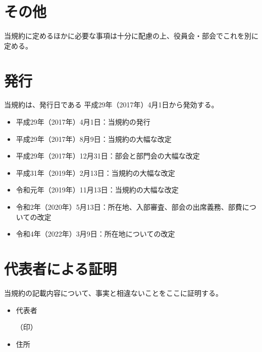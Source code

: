 \documentclass[12pt, unicode, a4paper]{ltjsreport}
\begin{document}
    \section*{その他}
        当規約に定めるほかに必要な事項は十分に配慮の上、役員会・部会でこれを別に定める。

    \section*{発行}
        当規約は、発行日である 平成29年（2017年）4月1日から発効する。
        \begin{itemize}
            \item 平成29年（2017年）4月1日：当規約の発行
            \item 平成29年（2017年）8月9日：当規約の大幅な改定
            \item 平成29年（2017年）12月31日：部会と部門会の大幅な改定
            \item 平成31年（2019年）2月13日：当規約の大幅な改定
            \item 令和元年（2019年）11月13日：当規約の大幅な改定
            \item 令和2年（2020年）5月13日：所在地、入部審査、部会の出席義務、部費についての改定
            \item 令和4年（2022年）3月9日：所在地についての改定
        \end{itemize}

    \section*{代表者による証明}
        当規約の記載内容について、事実と相違ないことをここに証明する。
        \begin{itemize}
            \item 代表者
            \begin{flushright}
                （印）
            \end{flushright}
            \item 住所
        \end{itemize}
\end{document}
